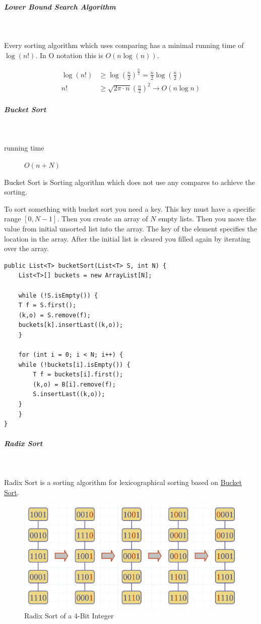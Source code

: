 \documentclass[11pt,twoside,twocolumn,landscape]{article}
\begin{document}
\subparagraph{Lower Bound Search Algorithm} \
\label{sec:orge02673d}

Every sorting algorithm which uses comparing has a minimal running time of \(\log(n!)\).
In O notation this is \(O(n \log(n))\).

\begin{align}
\log(n!) &\geq \log{(\frac{n}{2})^{\frac{n}{2}}} = \frac{n}{2}\log(\frac{n}{2}) \\
n! &\geq \sqrt{2\pi \cdot n}(\frac{n}{2})^2 \rightarrow O(n \log n)
\end{align}

\subparagraph{Bucket Sort} \
\label{sec:org1b5c314}

\begin{description}
\item[{running time}] \(O(n + N)\)
\end{description}

Bucket Sort is Sorting algorithm which does not use any compares to achieve the sorting.

To sort something with bucket sort you need a key.
This key must have a specific range \([0, N-1]\).
Then you create an array of \(N\) empty lists.
Then you move the value from initial unsorted list into the array.
The key of the element specifies the location in the array.
After the initial list is cleared you filled again by iterating over the array.

\lstset{language=java,label= ,caption= ,captionpos=b,numbers=none}
\begin{lstlisting}
public List<T> bucketSort(List<T> S, int N) {
    List<T>[] buckets = new ArrayList[N];

    while (!S.isEmpty()) {
	T f = S.first();
	(k,o) = S.remove(f);
	buckets[k].insertLast((k,o));
    }

    for (int i = 0; i < N; i++) {
	while (!buckets[i].isEmpty()) {
	    T f = buckets[i].first();
	    (k,o) = B[i].remove(f);
	    S.insertLast((k,o));
	}
    }
}

\end{lstlisting}

\subparagraph{Radix Sort} \
\label{sec:org2b2f972}

Radix Sort is a sorting algorithm for lexicographical sorting based on \href{../../../roam/20211215102604-bucket_sort.org}{Bucket Sort}.

\begin{figure}[htbp]
\centering
\includegraphics[width=.9\linewidth]{img/radix_sort.png}
\caption{\label{fig:org9e75117}Radix Sort of a 4-Bit Integer}
\end{figure}
\end{document}
